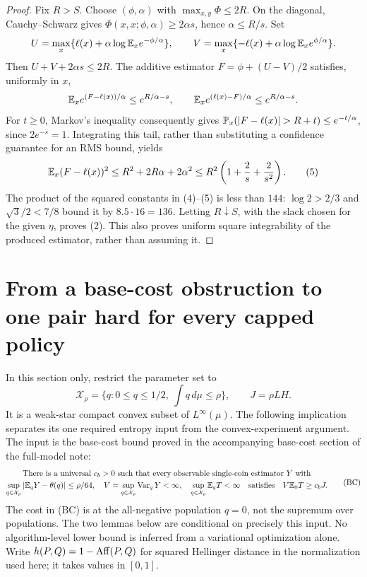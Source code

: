 \begin{proof}
Fix $R>S$. Choose $(\phi,\alpha)$ with
$\max_{x,y}\Phi\le2R$. On the diagonal, Cauchy--Schwarz gives
$\Phi(x,x;\phi,\alpha)\ge2\alpha s$, hence $\alpha\le R/s$.
Set
\[
 U=\max_x\{\ell(x)+\alpha\log\mathbb E_xe^{-\phi/\alpha}\},\qquad
 V=\max_x\{-\ell(x)+\alpha\log\mathbb E_xe^{\phi/\alpha}\}.
\]
Then $U+V+2\alpha s\le2R$. The additive estimator
$F=\phi+(U-V)/2$ satisfies, uniformly in $x$,
\[
 \mathbb E_x e^{(F-\ell(x))/\alpha}\le e^{R/\alpha-s},\qquad
 \mathbb E_x e^{(\ell(x)-F)/\alpha}\le e^{R/\alpha-s}.
\]
For $t\ge0$, Markov's inequality consequently gives
$\Pp_x(|F-\ell(x)|>R+t)\le e^{-t/\alpha}$, since $2e^{-s}=1$.
Integrating this tail, rather than substituting a confidence guarantee
for an RMS bound, yields
\[
 \mathbb E_x(F-\ell(x))^2
 \le R^2+2R\alpha+2\alpha^2
 \le R^2\left(1+\frac2s+\frac2{s^2}\right).                \tag{5}
\]
The product of the squared constants in (4)--(5) is less than $144$:
$\log2>2/3$ and $\sqrt3/2<7/8$ bound it by $8.5\cdot16=136$.
Letting $R\downarrow S$, with the slack chosen for the given $\eta$,
proves (2). This also proves uniform square integrability of the produced
estimator, rather than assuming it.
\end{proof}

\section{From a base-cost obstruction to one pair hard for every capped policy}
In this section only, restrict the parameter set to
\[
 \mathcal X_\rho=\{q:0\le q\le1/2,\ \int q\,d\mu\le\rho\},
 \qquad J=\rho L H.
\]
It is a weak-star compact convex subset of $L^\infty(\mu)$.
The following implication separates its one required entropy input from
the convex-experiment argument. The input is the base-cost bound proved in
the accompanying base-cost section of the full-model note:
\begin{equation}\label{eq:base-cost-input}
 \begin{gathered}
 \text{There is a universal }c_b>0\text{ such that every observable
 single-coin estimator }Y\text{ with}\\
 \sup_{q\in\mathcal X_\rho}|\mathbb E_qY-\theta(q)|\le\rho/64,
 \quad V=\sup_{q\in\mathcal X_\rho}\operatorname{Var}_qY<\infty,
 \quad \sup_{q\in\mathcal X_\rho}\mathbb E_qT<\infty
 \quad\text{satisfies}\quad V\mathbb E_0T\ge c_bJ.
 \end{gathered}                                                     \tag{BC}
\end{equation}
The cost in (BC) is at the all-negative population $q=0$, not the supremum
over populations. The two lemmas below are conditional on precisely this
input. No algorithm-level lower bound is inferred from a variational
optimization alone. Write
$h(P,Q)=1-\operatorname{Aff}(P,Q)$ for squared Hellinger distance in the normalization
used here; it takes values in $[0,1]$.

